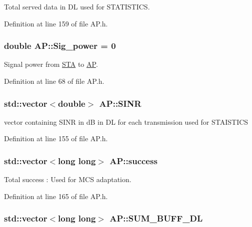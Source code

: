 Total served data in D\-L used for S\-T\-A\-T\-I\-S\-T\-I\-C\-S. 



Definition at line 159 of file A\-P.\-h.

\hypertarget{classAP_a39256449e3187dd7b8bdd1cfa0fbb2da}{
\subsubsection[{Sig\-\_\-power}]{\setlength{\rightskip}{0pt plus 5cm}double A\-P\-::\-Sig\-\_\-power = 0\hspace{0.3cm}{\ttfamily [private]}}}\label{classAP_a39256449e3187dd7b8bdd1cfa0fbb2da}


Signal power from \hyperlink{classSTA}{S\-T\-A} to \hyperlink{classAP}{A\-P}. 



Definition at line 68 of file A\-P.\-h.

\hypertarget{classAP_a462a6a6a0887dae6d6a045015a05c13a}{
\subsubsection[{S\-I\-N\-R}]{\setlength{\rightskip}{0pt plus 5cm}std\-::vector$<$double$>$ A\-P\-::\-S\-I\-N\-R}}\label{classAP_a462a6a6a0887dae6d6a045015a05c13a}


vector containing S\-I\-N\-R in d\-B in D\-L for each transmission used for S\-T\-A\-I\-S\-T\-I\-C\-S 



Definition at line 155 of file A\-P.\-h.

\hypertarget{classAP_aa9d8130f487d3ba13dc6b22fe5e3868d}{
\subsubsection[{success}]{\setlength{\rightskip}{0pt plus 5cm}std\-::vector$<$long long$>$ A\-P\-::success}}\label{classAP_aa9d8130f487d3ba13dc6b22fe5e3868d}


Total success \-: Used for M\-C\-S adaptation. 



Definition at line 165 of file A\-P.\-h.

\hypertarget{classAP_aaff6ce72b09dc955c0aaff3dc9fa0f04}{
\subsubsection[{S\-U\-M\-\_\-\-B\-U\-F\-F\-\_\-\-D\-L}]{\setlength{\rightskip}{0pt plus 5cm}std\-::vector$<$long long$>$ A\-P\-::\-S\-U\-M\-\_\-\-B\-U\-F\-F\-\_\-\-D\-L}}\label{classAP_aaff6ce72b09dc955c0aaff3dc9fa0f04}


